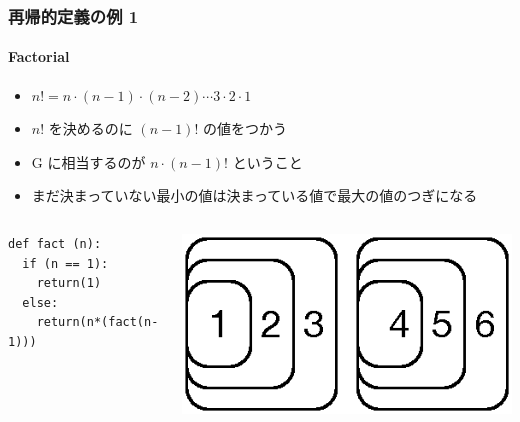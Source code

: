 \begin{frame}
\frametitle{再帰的定義の例 1}
\framesubtitle{Factorial}
  \begin{itemize}
\item \(n!=n\cdot(n-1)\cdot(n-2)\cdots 3\cdot 2\cdot 1\)
\item \(n!\) を決めるのに \((n-1)!\) の値をつかう
\item G に相当するのが \(n\cdot(n-1)!\) ということ
\item まだ決まっていない最小の値は決まっている値で最大の値のつぎになる
  \end{itemize}
  \begin{columns}[c]
    \begin{column}{0.5\textwidth}
      \begin{lstlisting}[caption={fact.py},label=fact-rec]
def fact (n):
  if (n == 1):
    return(1)
  else:
    return(n*(fact(n-1)))
      \end{lstlisting}
    \end{column}
    \begin{column}{0.45\textwidth}
      \begin{example}[\(4!\)]
\includegraphics[scale=0.5]{./Figure/elementaryCS-2nd-figFact.eps}
      \end{example}
    \end{column}
  \end{columns}
\end{frame}
